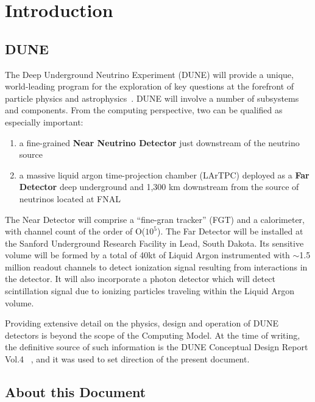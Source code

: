 \section{Introduction}
\subsection{DUNE}

The Deep Underground Neutrino Experiment (DUNE) will provide a unique, world-leading program
for the exploration of key questions at the forefront of particle physics and astrophysics~\cite{sciopps,cdr_vol2}.
DUNE will involve a number of subsystems and components. From the computing perspective, two can be
qualified as especially important:

\begin{enumerate}

\item a fine-grained \textbf{Near Neutrino Detector} just downstream of the neutrino source
\item a massive liquid argon time-projection chamber (LArTPC) deployed as a \textbf{Far
Detector} deep underground and 1,300 km downstream from the source of neutrinos located at FNAL

\end{enumerate}

The Near Detector will comprise a ``fine-gran tracker'' (FGT) and a calorimeter, with channel count of the order of O($10^{5}$).
The Far Detector will be installed at the Sanford Underground Research Facility in Lead, South Dakota.
Its sensitive volume will be formed by a total of 40kt of Liquid Argon instrumented with $\sim$1.5 million readout
channels to detect ionization signal resulting from interactions in the detector. It will also incorporate a photon detector which will detect scintillation
signal due to ionizing particles traveling within the Liquid Argon volume.

Providing extensive detail on the physics, design and operation of DUNE detectors  is beyond the scope of the Computing Model.
At the time of writing, the definitive source of such information is the DUNE Conceptual Design Report Vol.4 ~\cite{cdr_vol4_docdb}, and 
it was used to set direction of the present document.


\subsection{About this Document}
\label{sec:modelrole}

